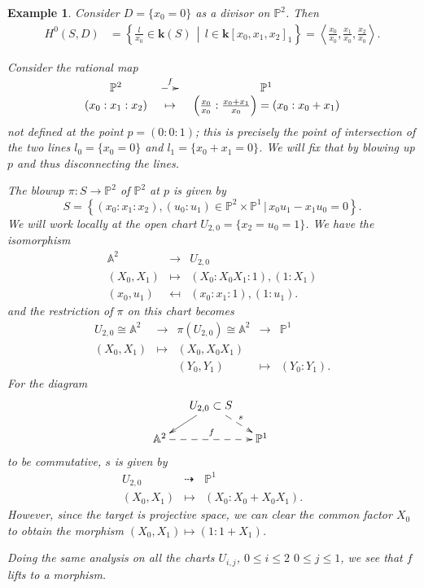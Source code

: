 \documentclass[a4paper,11pt]{amsart}
\newtheorem{example}[theorem]{Example}
\renewcommand{\AA}{\mathbb{A}}
\newcommand{\PP}{\mathbb{P}}
\newcommand{\kk}{\textbf{k}}
\newcommand{\isom}{\cong}
\newcommand{\rmap}{\dashrightarrow}
\begin{document}
\begin{example}
	Consider $D = \{x_0 = 0\}$ as a divisor on $\PP^2$.
	Then 
	\begin{align*}
		H^0(S,D) &= \left\{ \frac{l}{x_0} \in \kk(S) \,\middle|\, l \in \kk[x_0,x_1,x_2]_1 \right\}  = \left\langle \frac{x_0}{x_0}, \frac{x_1}{x_0}, \frac{x_2}{x_0} \right\rangle.
	\end{align*}
	 
	
	Consider the rational map	
	\[
	\begin{array}{ccc}
		\PP^2 & {\smash{\xymatrix@C=0.5cm@M=1.5pt{ \ar@{-->}[r]^f& }}}& \PP^1\\
		(x_0:x_1:x_2) & \mapsto & \left(\frac{x_0}{x_0} : \frac{x_0+x_1}{x_0}\right) =  (x_0:x_0+x_1)
	\end{array}
	\]
	not defined at the point $p = (0:0:1)$;
	this is precisely the point of intersection of the two lines $l_0 = \{x_0 = 0\}$ and $l_1 = \{x_0 + x_1 = 0\}$.
	We will fix that by blowing up $p$ and thus disconnecting the lines.
	
	The blowup $\pi\colon S \to \PP^2$ of $\PP^2$ at $p$ is given by
	\[
	S  = \left\{(x_0:x_1:x_2),(u_0:u_1) \in \PP^2\times \PP^1 \,|\, x_0u_1 - x_1u_0 = 0 \right\}.
	\]
	We will work locally at the open chart $U_{2,0} = \{x_2 = u_0 = 1\}$.
	We have the isomorphism
	\[
	\begin{array}{ccc}
		\AA^2 & \to & U_{2,0}\\
		(X_0,X_1) & \mapsto & (X_0 : X_0X_1 : 1),(1 : X_1)\\
		(x_0,u_1) & \mapsfrom & (x_0:x_1:1),(1:u_1).
	\end{array}
	\]
	and the restriction of $\pi$ on this chart becomes
	\[
	\begin{array}{ccccc}
		U_{2,0}\isom \AA^2 & \to & \pi(U_{2,0}) \isom \AA^2 & \to & \PP^1 \\
		(X_0,X_1) & \mapsto & (X_0,X_0X_1) \\
		&& (Y_0,Y_1) & \mapsto & (Y_0:Y_1).
	\end{array}
	\]
	For the diagram 
	\[
	\xymatrix@R=.5cm@C=.5cm{
		& U_{2,0} \subset S \ar[ld] \ar@{-->}[rd]^s\\
		\AA^2 \ar@{-->}[rr]^f && \PP^1
	\
	}
	\]
	to be commutative, $s$ is given by 
	\begin{equation}\label{eq:pullbackLift}
	\begin{array}{ccc}
		U_{2,0} & \rmap & \PP^1\\
		(X_0,X_1) & \mapsto & (X_0:X_0+X_0X_1). 
	\end{array}
	\end{equation}
	However, since the target is projective space, we can clear the common factor $X_0$ to obtain the  morphism $(X_0,X_1) \mapsto  (1:1+X_1)$.
	
	Doing the same analysis on all the charts $U_{i,j}$, $0\leq i \leq 2$ $0 \leq j \leq 1$,  we see that $f$ lifts to a morphism.
\end{example}
\end{document}
